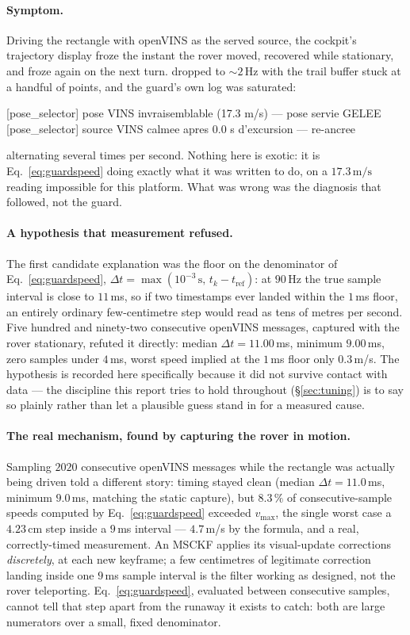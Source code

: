\paragraph{Symptom.} Driving the rectangle with openVINS as the served
source, the cockpit's trajectory display froze the instant the rover moved,
recovered while stationary, and froze again on the next turn.
 dropped to $\sim\!2$\,Hz with the trail buffer
stuck at a handful of points, and the guard's own log was saturated:
\begin{center}\ttfamily\footnotesize
[pose\_selector] pose VINS invraisemblable (17.3 m/s) --- pose servie GELEE\\{}
[pose\_selector] source VINS calmee apres 0.0 s d'excursion --- re-ancree
\end{center}
alternating several times per second. Nothing here is exotic: it is
Eq.~\ref{eq:guardspeed} doing exactly what it was written to do, on a
$17.3\,\text{m/s}$ reading impossible for this platform. What was wrong was
the diagnosis that followed, not the guard.

\paragraph{A hypothesis that measurement refused.} The first candidate
explanation was the floor on the denominator of Eq.~\ref{eq:guardspeed},
$\Delta t = \max(10^{-3}\,\text{s},\, t_k - t_{\text{ref}})$: at $90$\,Hz the
true sample interval is close to $11$\,ms, so if two timestamps ever landed
within the $1$\,ms floor, an entirely ordinary few-centimetre step would read
as tens of metres per second. Five hundred and ninety-two consecutive
openVINS messages, captured with the rover stationary, refuted it directly:
median $\Delta t = 11.00$\,ms, minimum $9.00$\,ms, zero samples under
$4$\,ms, worst speed implied at the $1$\,ms floor only $0.3$\,m/s. The
hypothesis is recorded here specifically because it did not survive contact
with data --- the discipline this report tries to hold throughout
(\S\ref{sec:tuning}) is to say so plainly rather than let a plausible guess
stand in for a measured cause.

\paragraph{The real mechanism, found by capturing the rover in motion.}
Sampling $2020$ consecutive openVINS messages while the rectangle was
actually being driven told a different story: timing stayed clean (median
$\Delta t=11.0$\,ms, minimum $9.0$\,ms, matching the static capture), but
$8.3\,\%$ of consecutive-sample speeds computed by Eq.~\ref{eq:guardspeed}
exceeded $v_{\max}$, the single worst case a $4.23$\,cm step inside a
$9$\,ms interval --- $4.7$\,m/s by the formula, and a real, correctly-timed
measurement. An MSCKF applies its visual-update corrections
\emph{discretely}, at each new keyframe; a few centimetres of legitimate
correction landing inside one $9$\,ms sample interval is the filter working
as designed, not the rover teleporting. Eq.~\ref{eq:guardspeed}, evaluated
between consecutive samples, cannot tell that step apart from the runaway it
exists to catch: both are large numerators over a small, fixed denominator.

